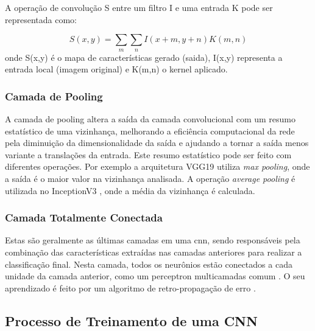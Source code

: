 A operação de convolução S entre um filtro I e uma entrada K pode ser representada como:

\begin{equation}
    \label{eqn:convolution}
    S(x,y) = \sum_{m}\sum_{n}I(x+m,y+n)K(m,n)
\end{equation}
onde S(x,y) é o mapa de características gerado (saida), I(x,y) representa a entrada local (imagem original) e K(m,n) o kernel aplicado.
\subsubsection{Camada de Pooling}


A camada de pooling altera a saída da camada convolucional com um resumo estatístico de uma vizinhança, melhorando a eficiência computacional da rede pela diminuição da dimensionalidade da saída e ajudando a tornar a saída menos variante a translações da entrada.
Este resumo estatístico pode ser feito com diferentes operações. Por exemplo a arquitetura VGG19 \cite{vgg} utiliza \textit{max pooling}, onde a saída é o maior valor na vizinhança analisada. A operação \textit{average pooling} é utilizada no InceptionV3 \cite{inceptionv3}, onde a média da vizinhança é calculada.


\subsubsection{Camada Totalmente Conectada}

Estas são geralmente as últimas camadas em uma \acrshort{cnn}, sendo responsáveis pela combinação das características extraídas nas camadas anteriores para realizar a classificação final. 
Nesta camada, todos os neurônios estão conectados a cada unidade da camada anterior, como um perceptron multicamadas comum \cite{MURTAGH1991183}. 
O seu aprendizado é feito por um algoritmo de retro-propagação de erro \cite{Rumelhart1986LearningRB}.
\subsection{Processo de Treinamento de uma CNN}


